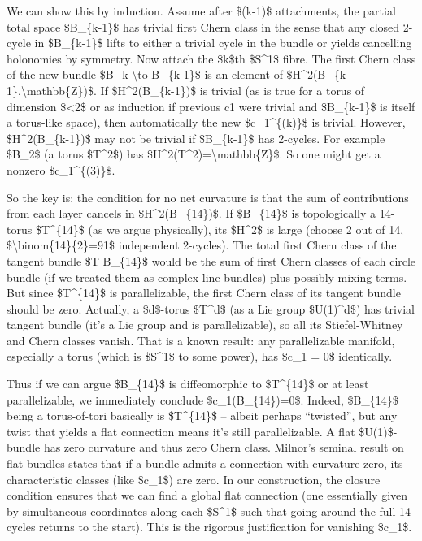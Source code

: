 \documentclass[]{article}
\begin{document}
We can show this by induction. Assume after \$(k-1)\$ attachments, the
partial total space \$B\_\{k-1\}\$ has trivial first Chern class in the
sense that any closed 2-cycle in \$B\_\{k-1\}\$ lifts to either a
trivial cycle in the bundle or yields cancelling holonomies by symmetry.
Now attach the \$k\$th \$S\^{}1\$ fibre. The first Chern class of the
new bundle \$B\_k \textbackslash{}to B\_\{k-1\}\$ is an element of
\$H\^{}2(B\_\{k-1\},\textbackslash{}mathbb\{Z\})\$. If
\$H\^{}2(B\_\{k-1\})\$ is trivial (as is true for a torus of dimension
\$\textless{}2\$ or as induction if previous c1 were trivial and
\$B\_\{k-1\}\$ is itself a torus-like space), then automatically the new
\$c\_1\^{}\{(k)\}\$ is trivial. However, \$H\^{}2(B\_\{k-1\})\$ may not
be trivial if \$B\_\{k-1\}\$ has 2-cycles. For example \$B\_2\$ (a torus
\$T\^{}2\$) has \$H\^{}2(T\^{}2)=\textbackslash{}mathbb\{Z\}\$. So one
might get a nonzero \$c\_1\^{}\{(3)\}\$.

So the key is: the condition for no net curvature is that the sum of
contributions from each layer cancels in \$H\^{}2(B\_\{14\})\$. If
\$B\_\{14\}\$ is topologically a 14-torus \$T\^{}\{14\}\$ (as we argue
physically), its \$H\^{}2\$ is large (choose 2 out of 14,
\$\textbackslash{}binom\{14\}\{2\}=91\$ independent 2-cycles). The total
first Chern class of the tangent bundle \$T B\_\{14\}\$ would be the sum
of first Chern classes of each circle bundle (if we treated them as
complex line bundles) plus possibly mixing terms. But since
\$T\^{}\{14\}\$ is parallelizable, the first Chern class of its tangent
bundle should be zero. Actually, a \$d\$-torus \$T\^{}d\$ (as a Lie
group \$U(1)\^{}d\$) has trivial tangent bundle (it's a Lie group and is
parallelizable), so all its Stiefel-Whitney and Chern classes vanish​.
That is a known result: any parallelizable manifold, especially a torus
(which is \$S\^{}1\$ to some power), has \$c\_1 = 0\$ identically​.

Thus if we can argue \$B\_\{14\}\$ is diffeomorphic to \$T\^{}\{14\}\$
or at least parallelizable, we immediately conclude
\$c\_1(B\_\{14\})=0\$. Indeed, \$B\_\{14\}\$ being a torus-of-tori
basically is \$T\^{}\{14\}\$ -- albeit perhaps ``twisted'', but any
twist that yields a flat connection means it's still parallelizable. A
flat \$U(1)\$-bundle has zero curvature and thus zero Chern class​.
Milnor's seminal result on flat bundles states that if a bundle admits a
connection with curvature zero, its characteristic classes (like
\$c\_1\$) are zero​. In our construction, the closure condition ensures
that we can find a global flat connection (one essentially given by
simultaneous coordinates along each \$S\^{}1\$ such that going around
the full 14 cycles returns to the start). This is the rigorous
justification for vanishing \$c\_1\$.
\end{document}
